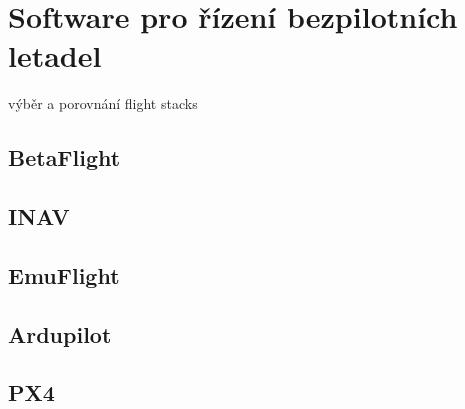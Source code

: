 \chapter{Software pro řízení bezpilotních letadel}

výběr a porovnání flight stacks

\section{BetaFlight}

\section{INAV}

\section{EmuFlight}

\section{Ardupilot}

\section{PX4}